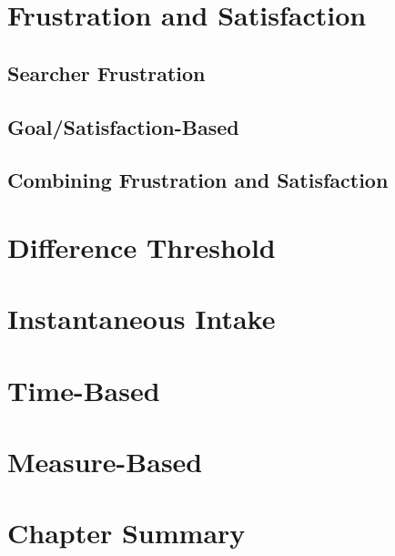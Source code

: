 \section{Frustration and Satisfaction}

\subsection{Searcher Frustration}

\subsection{Goal/Satisfaction-Based}

\subsection{Combining Frustration and Satisfaction}

\section{Difference Threshold}

\section{Instantaneous Intake}

\section{Time-Based}

\section{Measure-Based}

\section{Chapter Summary}